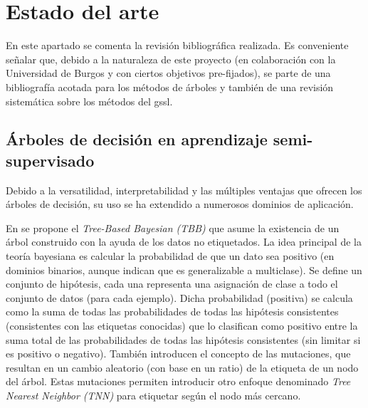 \chapter{Estado del arte}
\label{estado-arte}

En este apartado se comenta la revisión bibliográfica realizada. Es conveniente señalar que, debido a la naturaleza de este proyecto (en colaboración con la Universidad de Burgos y con ciertos objetivos pre-fijados), se parte de una bibliografía acotada para los métodos de árboles y también de una revisión sistemática sobre los métodos del \Gls{gssl}.

\section{Árboles de decisión en aprendizaje semi-supervisado}

Debido a la versatilidad, interpretabilidad y las múltiples ventajas que ofrecen los árboles de decisión, su uso se ha extendido a numerosos dominios de aplicación.

En \cite{kemp2003semi} se propone el \textit{Tree-Based Bayesian (TBB)} que asume la existencia de un árbol construido con la ayuda de los datos no etiquetados. La idea principal de la teoría bayesiana es calcular la probabilidad de que un dato sea positivo (en dominios binarios, aunque indican que es generalizable a multiclase). Se define un conjunto de hipótesis, cada una representa una asignación de clase a todo el conjunto de datos (para cada ejemplo). Dicha probabilidad (positiva) se calcula como la suma de todas las probabilidades de todas las hipótesis consistentes (consistentes con las etiquetas conocidas) que lo clasifican como positivo entre la suma total de las probabilidades de todas las hipótesis consistentes (sin limitar si es positivo o negativo). También introducen el concepto de las mutaciones, que resultan en un cambio aleatorio (con base en un ratio) de la etiqueta de un nodo del árbol. Estas mutaciones permiten introducir otro enfoque denominado \textit{Tree Nearest Neighbor (TNN)} para etiquetar según el nodo más cercano.

